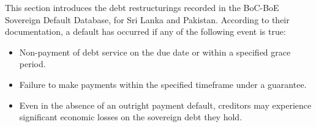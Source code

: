 This section introduces the debt restructurings recorded in the BoC-BoE Sovereign Default Database, for Sri Lanka and Pakistan.
According to their documentation, a default has occurred if any of the following event is true:
\begin{itemize}
    \item Non-payment of debt service on the due date or within a specified grace period.
    \item Failure to make payments within the specified timeframe under a guarantee.
    \item Even in the absence of an outright payment default, creditors may experience significant economic losses on the sovereign debt they hold.
\end{itemize}

